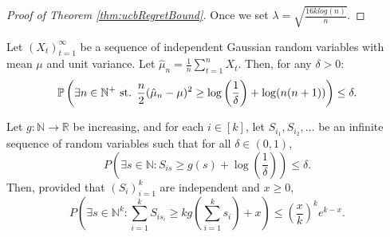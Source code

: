 \begin{proof}[Proof of Theorem \ref{thm:ucbRegretBound}]
Once we set $\lambda = \sqrt{\frac{16klog(n)}{n}}$.

\end{proof}


\label{lem:upperBoundSeq}
\begin{lemma}
Let $(X_t)_{t=1}^\infty$ be a sequence of independent Gaussian random variables with mean $\mu$ and unit variance. Let $\hat{\mu}_n = \frac{1}{n} \sum_{t=1}^n X_t$. Then, for any $\delta > 0$:
$$
\mathbb{P}\left(\exists n \in \mathbb{N}^+ \text{ st. } \frac{n}{2} (\hat{\mu}_n - \mu)^2 \geq \log\left(\frac{1}{\delta}\right) + \log(n(n + 1))\right) \leq \delta.
$$
\end{lemma}

\label{lem:increasingSeqUpper}
\begin{lemma}
Let $g : \mathbb{N} \to \mathbb{R}$ be increasing, and for each $i \in [k]$, let $S_{i_1}, S_{i_2}, \ldots$ be an infinite sequence of random variables such that for all $\delta \in (0, 1)$,
$$
P \left(\exists s \in \mathbb{N} : S_{is} \geq g(s) + \log\left(\frac{1}{\delta}\right)\right) \leq \delta.
$$
Then, provided that $(S_i)_{i=1}^k$ are independent and $x \geq 0$,
\[
P \left(\exists s \in \mathbb{N}^k : \sum_{i=1}^k S_{is_i} \geq kg \left(\sum_{i=1}^k s_i\right) + x\right) \leq \left(\frac{x}{k}\right)^k e^{k-x}.
\]
\end{lemma}
